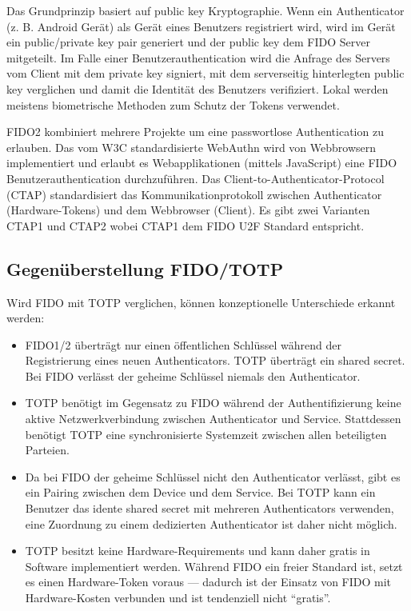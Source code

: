 Das Grundprinzip basiert auf public key Kryptographie. Wenn ein Authenticator (z. B. Android Gerät) als Gerät eines Benutzers registriert wird, wird im Gerät ein public/private key pair generiert und der public key dem FIDO Server mitgeteilt. Im Falle einer Benutzerauthentication wird die Anfrage des Servers vom Client mit dem private key signiert, mit dem serverseitig hinterlegten public key verglichen und damit die Identität des Benutzers verifiziert. Lokal werden meistens biometrische Methoden zum Schutz der Tokens verwendet.

FIDO2 kombiniert mehrere Projekte um eine passwortlose Authentication zu erlauben. Das vom W3C standardisierte WebAuthn wird von Webbrowsern implementiert und erlaubt es Webapplikationen (mittels JavaScript) eine FIDO Benutzerauthentication durchzuführen. Das Client-to-Authenticator-Protocol (CTAP) standardisiert das Kommunikationprotokoll zwischen Authenticator (Hardware-Tokens) und dem Webbrowser (Client). Es gibt zwei Varianten CTAP1 und CTAP2 wobei CTAP1 dem FIDO U2F Standard entspricht.

\subsection{Gegenüberstellung FIDO/TOTP}

Wird FIDO mit TOTP verglichen, können konzeptionelle Unterschiede erkannt werden:

\begin{itemize}
	\item FIDO1/2 überträgt nur einen öffentlichen Schlüssel während der Registrierung eines neuen Authenticators. TOTP überträgt ein shared secret. Bei FIDO verlässt der geheime Schlüssel niemals den Authenticator.
	\item TOTP benötigt im Gegensatz zu FIDO während der Authentifizierung keine aktive Netzwerkverbindung zwischen Authenticator und Service. Stattdessen benötigt TOTP eine synchronisierte Systemzeit zwischen allen beteiligten Parteien.
	\item Da bei FIDO der geheime Schlüssel nicht den Authenticator verlässt, gibt es ein Pairing zwischen dem Device und dem Service. Bei TOTP kann ein Benutzer das idente shared secret mit mehreren Authenticators verwenden, eine Zuordnung zu einem dedizierten Authenticator ist daher nicht möglich.
	\item TOTP besitzt keine Hardware-Requirements und kann daher gratis in Software implementiert werden. Während FIDO ein freier Standard ist, setzt es einen Hardware-Token voraus --- dadurch ist der Einsatz von FIDO mit Hardware-Kosten verbunden und ist tendenziell nicht ``gratis''.
\end{itemize}

